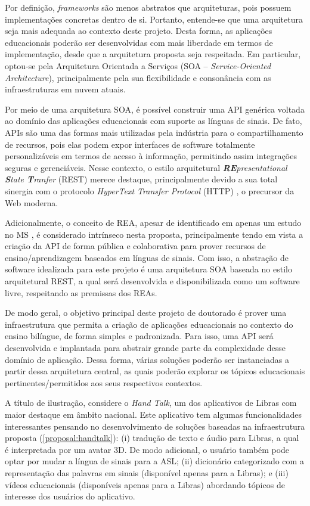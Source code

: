 Por definição, \textit{frameworks} são menos abstratos que arquiteturas, pois possuem implementações concretas dentro de si. Portanto, entende-se que uma arquitetura seja mais adequada ao contexto deste projeto. Desta forma, as aplicações educacionais poderão ser desenvolvidas com mais liberdade em termos de implementação, desde que a arquitetura proposta seja respeitada. Em particular, optou-se pela Arquitetura Orientada a Serviços (SOA -- \textit{Service-Oriented Architecture}), principalmente pela sua flexibilidade e consonância com as infraestruturas em nuvem atuais.

Por meio de uma arquitetura SOA, é possível construir uma API genérica voltada ao domínio das aplicações educacionais com suporte as línguas de sinais. De fato, APIs são uma das formas mais utilizadas pela indústria para o compartilhamento de recursos, pois elas podem expor interfaces de software totalmente personalizáveis em termos de acesso à informação, permitindo assim integrações seguras e gerenciáveis. Nesse contexto, o estilo arquitetural \textit{\textbf{RE}presentational \textbf{S}tate \textbf{T}ranfer} (REST) merece destaque, principalmente devido a sua total sinergia com o protocolo \textit{HyperText Transfer Protocol} (HTTP) \cite{Fielding2000}, o precursor da Web moderna.

Adicionalmente, o conceito de REA, apesar de identificado em apenas um estudo no MS \cite{BRA23}, é considerado intrínseco nesta proposta, principalmente tendo em vista a criação da API de forma pública e colaborativa para prover recursos de ensino/aprendizagem baseados em línguas de sinais. Com isso, a abstração de software idealizada para este projeto é uma arquitetura SOA baseada no estilo arquitetural REST, a qual será desenvolvida e disponibilizada como um software livre, respeitando as premissas dos REAs. %

De modo geral, o objetivo principal deste projeto de doutorado é prover uma infraestrutura que permita a criação de aplicações educacionais no contexto do ensino bilíngue, de forma simples e padronizada. Para isso, uma API será desenvolvida e implantada para abstrair grande parte da complexidade desse domínio de aplicação. Dessa forma, várias soluções poderão ser instanciadas a partir dessa arquitetura central, as quais poderão explorar os tópicos educacionais pertinentes/permitidos aos seus respectivos contextos.

A título de ilustração, considere o \textit{Hand Talk}, um dos aplicativos de Libras com maior destaque em âmbito nacional. Este aplicativo tem algumas funcionalidades interessantes pensando no desenvolvimento de soluções baseadas na infraestrutura proposta (\autoref{proposal:handtalk}): (i) tradução de texto e áudio para Libras, a qual é interpretada por um avatar 3D. De modo adicional, o usuário também pode optar por mudar a língua de sinais para a ASL; (ii) dicionário categorizado com a representação das palavras em sinais (disponível apenas para a Libras); e (iii) vídeos educacionais  (disponíveis apenas para a Libras) abordando tópicos de interesse dos usuários do aplicativo.

